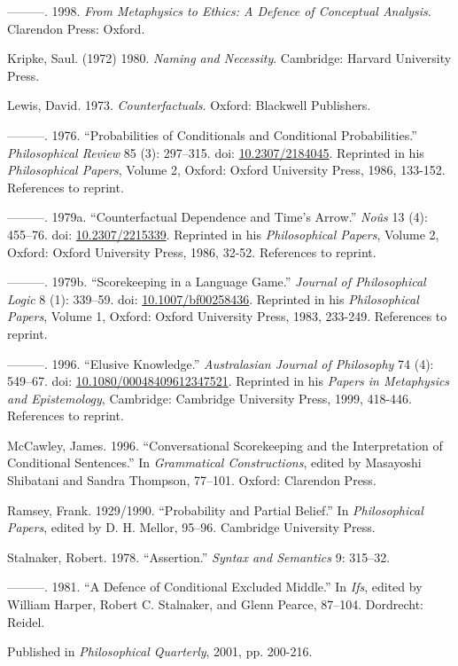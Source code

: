 \documentclass[
  11pt,
  letterpaper,
  DIV=11,
  numbers=noendperiod,
  twoside]{scrartcl}
\newlength{\cslhangindent}
\newenvironment{CSLReferences}[2] %
 {\begin{list}{}{%
  \setlength{\itemindent}{0pt}
  \setlength{\leftmargin}{0pt}
  \setlength{\parsep}{0pt}
  \ifodd #1
   \setlength{\leftmargin}{\cslhangindent}
   \setlength{\itemindent}{-1\cslhangindent}
  \fi
  \setlength{\itemsep}{#2\baselineskip}}}
 {\end{list}}
\begin{document}
\begin{CSLReferences}{1}{0}
---------. 1998. \emph{From Metaphysics to Ethics: A Defence of
Conceptual Analysis}. Clarendon Press: Oxford.

Kripke, Saul. (1972) 1980. \emph{Naming and Necessity}. Cambridge:
Harvard University Press.

Lewis, David. 1973. \emph{Counterfactuals}. Oxford: Blackwell
Publishers.

---------. 1976. {``Probabilities of Conditionals and Conditional
Probabilities.''} \emph{Philosophical Review} 85 (3): 297--315. doi:
\href{https://doi.org/10.2307/2184045}{10.2307/2184045}. Reprinted in
his \emph{Philosophical Papers}, Volume 2, Oxford: Oxford University
Press, 1986, 133-152. References to reprint.

---------. 1979a. {``Counterfactual Dependence and Time's Arrow.''}
\emph{No{û}s} 13 (4): 455--76. doi:
\href{https://doi.org/10.2307/2215339}{10.2307/2215339}. Reprinted in
his \emph{Philosophical Papers}, Volume 2, Oxford: Oxford University
Press, 1986, 32-52. References to reprint.

---------. 1979b. {``Scorekeeping in a Language Game.''} \emph{Journal
of Philosophical Logic} 8 (1): 339--59. doi:
\href{https://doi.org/10.1007/bf00258436}{10.1007/bf00258436}. Reprinted
in his \emph{Philosophical Papers}, Volume 1, Oxford: Oxford University
Press, 1983, 233-249. References to reprint.

---------. 1996. {``Elusive Knowledge.''} \emph{Australasian Journal of
Philosophy} 74 (4): 549--67. doi:
\href{https://doi.org/10.1080/00048409612347521}{10.1080/00048409612347521}.
Reprinted in his \emph{Papers in Metaphysics and Epistemology},
Cambridge: Cambridge University Press, 1999, 418-446. References to
reprint.

McCawley, James. 1996. {``Conversational Scorekeeping and the
Interpretation of Conditional Sentences.''} In \emph{Grammatical
Constructions}, edited by Masayoshi Shibatani and Sandra Thompson,
77--101. Oxford: Clarendon Press.

Ramsey, Frank. 1929/1990. {``Probability and Partial Belief.''} In
\emph{Philosophical Papers}, edited by D. H. Mellor, 95--96. Cambridge
University Press.

Stalnaker, Robert. 1978. {``Assertion.''} \emph{Syntax and Semantics} 9:
315--32.

---------. 1981. {``A Defence of Conditional Excluded Middle.''} In
\emph{Ifs}, edited by William Harper, Robert C. Stalnaker, and Glenn
Pearce, 87--104. Dordrecht: Reidel.

\end{CSLReferences}



\noindent Published in\emph{
Philosophical Quarterly}, 2001, pp. 200-216.
\end{document}
